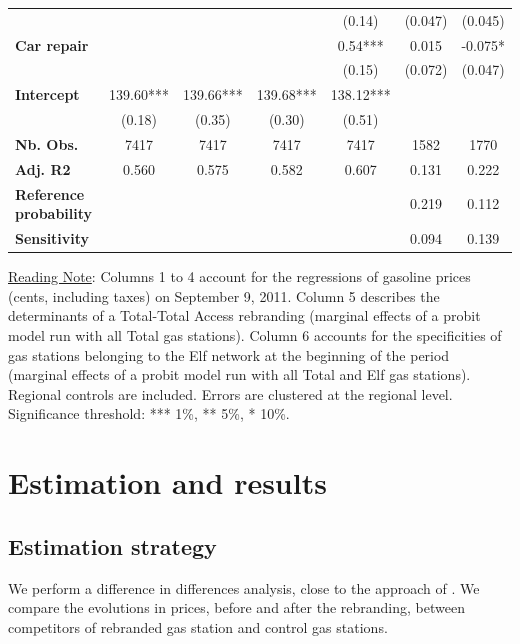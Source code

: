 \documentclass[english]{article}
\begin{document}
\begin{table}[H]
\begin{threeparttable}
\begin{footnotesize}
\begin{tabular}{l|cccccc}
 &  &  &  & (0.14)  & (0.047)  & (0.045)\tabularnewline
\textbf{Car repair}  &  &  &  & 0.54{*}{*}{*}  & 0.015  & -0.075{*}\tabularnewline
 &  &  &  & (0.15)  & (0.072)  & (0.047)\tabularnewline
\hline
\textbf{Intercept}  & 139.60{*}{*}{*}  & 139.66{*}{*}{*}  & 139.68{*}{*}{*}  & 138.12{*}{*}{*}  &  & \tabularnewline
 & (0.18)  & (0.35)  & (0.30)  & (0.51)  &  & \tabularnewline
\hline
\textbf{Nb. Obs.}  & 7417  & 7417  & 7417  & 7417  & 1582  & 1770\tabularnewline
\textbf{Adj. R2}  & 0.560  & 0.575  & 0.582  & 0.607  & 0.131  & 0.222\tabularnewline
\textbf{Reference probability}  &  &  &  &  & 0.219  & 0.112\tabularnewline
\textbf{Sensitivity}  &  &  &  &  & 0.094  & 0.139\tabularnewline
\hline
\hline
\end{tabular}
\end{footnotesize}
\end{threeparttable}
\end{table}

{\small{}\uline{Reading Note}}{\small{}: } Columns 1 to 4 account for the regressions of gasoline prices (cents, including taxes) on September 9, 2011. Column 5 describes the determinants of a Total-Total Access rebranding (marginal effects of a probit model run with all Total gas stations). Column 6 accounts for the specificities of gas stations belonging to the Elf network at the beginning of the period (marginal effects of a probit model run with all Total and Elf gas stations). Regional controls are included. Errors are clustered at the regional level. Significance threshold: {*}{*}{*} 1\%, {*}{*} 5\%, {*} 10\%.

\section{Estimation and results}

\subsection{Estimation strategy}

We perform a difference in differences analysis, close to the approach of \cite{HAS04}. We compare the evolutions in prices, before and after the rebranding, between competitors of rebranded gas station and control gas stations.\medskip{}
\end{document}

